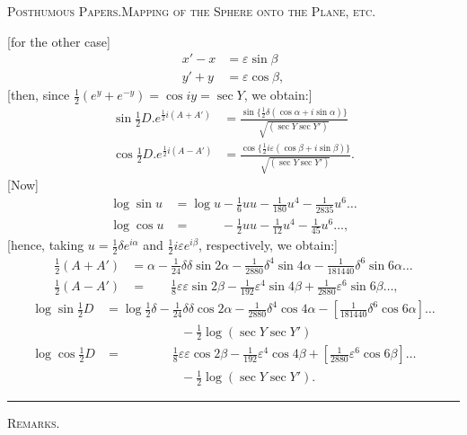 \begingroup
\clearpage
{}\hfill{\small\textsc{Posthumous Papers.\quad Mapping of the Sphere onto the Plane, etc.}}\hfill\mbox{}\par\medskip
\begingroup\small
[for the other case]
\[
\begin{aligned}
x'-x&=\varepsilon\sin\beta\\
y'+y&=\varepsilon\cos\beta,
\end{aligned}
\]
[then, since $\tfrac12(e^y+e^{-y})=\cos iy=\sec Y$, we obtain:]
\[
\begin{aligned}
\sin\tfrac12D.e^{\frac12i(A+A')}&=\frac{\sin\{\frac12\delta(\cos\alpha+i\sin\alpha)\}}{\sqrt{(\sec Y\sec Y')}}\\[5pt]
\cos\tfrac12D.e^{\frac12i(A-A')}&=\frac{\cos\{\frac12i\varepsilon(\cos\beta+i\sin\beta)\}}{\sqrt{(\sec Y\sec Y')}}.
\end{aligned}
\]
[Now]
\[
\begin{aligned}
\log\sin u&=\log u-\tfrac16uu-\tfrac1{180}u^4-\tfrac1{2835}u^6\ldots\\
\log\cos u&=\phantom{\log u}-\tfrac12uu-\tfrac1{12}u^4-\tfrac1{45}u^6\ldots,
\end{aligned}
\]
[hence, taking $u=\tfrac12\delta e^{i\alpha}$ and $\tfrac12i\varepsilon e^{i\beta}$, respectively, we obtain:]
\[
\begin{aligned}
\tfrac12(A+A')&=\alpha-\tfrac1{24}\delta\delta\sin2\alpha-\tfrac1{2880}\delta^4\sin4\alpha-\tfrac1{181440}\delta^6\sin6\alpha\ldots\\
\tfrac12(A-A')&=\phantom{\alpha-}\tfrac18\varepsilon\varepsilon\sin2\beta-\tfrac1{192}\varepsilon^4\sin4\beta+\tfrac1{2880}\varepsilon^6\sin6\beta\ldots,
\end{aligned}
\]
\[
\begin{aligned}
\log\sin\tfrac12D&=\log\tfrac12\delta-\tfrac1{24}\delta\delta\cos2\alpha-\tfrac1{2880}\delta^4\cos4\alpha-[\tfrac1{181440}\delta^6\cos6\alpha]\ldots\\
&\hspace{6em}-\tfrac12\log(\sec Y\sec Y')\\
\log\cos\tfrac12D&=\hspace{4em}\tfrac18\varepsilon\varepsilon\cos2\beta-\tfrac1{192}\varepsilon^4\cos4\beta+[\tfrac1{2880}\varepsilon^6\cos6\beta]\ldots\\
&\hspace{6em}-\tfrac12\log(\sec Y\sec Y').
\end{aligned}
\]
\begin{center}\rule{.18\textwidth}{.4pt}\par\medskip\textsc{Remarks.}\end{center}
